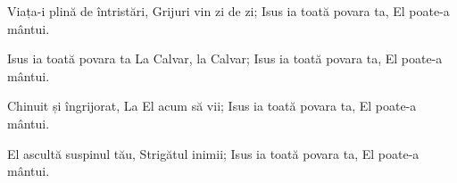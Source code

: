 \beginverse
Viața-i plină de întristări,
Grijuri vin zi de zi;
Isus ia toată povara ta,
El poate-a mântui.
\endverse

\beginchorus
Isus ia toată povara ta
La Calvar, la Calvar;
Isus ia toată povara ta,
El poate-a mântui.
\endchorus

\beginverse
Chinuit și îngrijorat,
La El acum să vii;
Isus ia toată povara ta,
El poate-a mântui.
\endverse

\beginverse
El ascultă suspinul tău,
Strigătul inimii;
Isus ia toată povara ta,
El poate-a mântui.
\endverse
\endsong